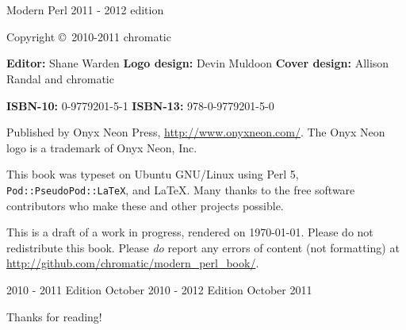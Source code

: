 \chapter*{}
\thispagestyle{empty}

\huge{Modern Perl}
\newline
\large{2011 - 2012 edition}
\newline
\newline
\normalsize

Copyright \copyright~2010-2011 chromatic

\vfill
\textbf{Editor:} Shane Warden\newline
\textbf{Logo design:} Devin Muldoon\newline
\textbf{Cover design:} Allison Randal and chromatic

\textbf{ISBN-10:} 0-9779201-5-1\newline
\textbf{ISBN-13:} 978-0-9779201-5-0

Published by Onyx Neon Press, \url{http://www.onyxneon.com/}.
The Onyx Neon logo is a trademark of Onyx Neon, Inc.

This book was typeset on Ubuntu GNU/Linux using Perl 5,
\textnhtt{Pod::PseudoPod::LaTeX}, and \LaTeX. Many thanks to the free software
contributors who make these and other projects possible.

This is a draft of a work in progress, rendered on \today. Please do not
redistribute this book. Please \emph{do} report any errors of content (not
formatting) at \url{http://github.com/chromatic/modern_perl_book/}.

2010 - 2011 Edition October 2010 - 2012 Edition October 2011

Thanks for reading!

